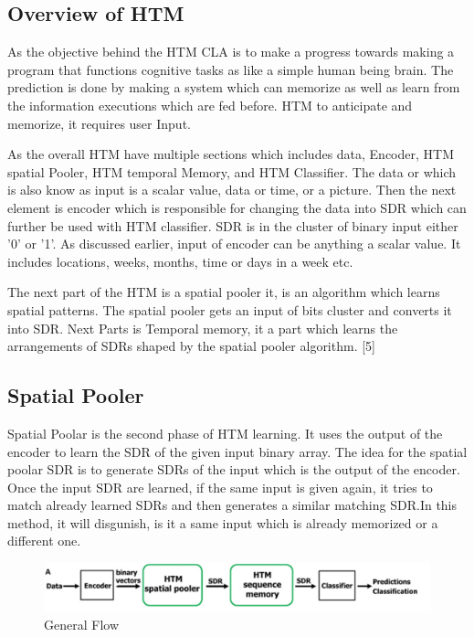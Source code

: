 \documentclass[conference]{IEEEtran}
\begin{document}
\subsection{Overview of HTM}
As the objective behind the HTM CLA is to make a progress towards making a program that functions cognitive tasks as like a simple human being brain. The prediction is done by making a system which can memorize as well as learn from the information executions which are fed before. HTM to anticipate and memorize, it requires user Input. 

As the overall HTM have multiple sections which includes data, Encoder, HTM spatial Pooler, HTM temporal Memory, and HTM Classifier. The data or which is also know as input is a scalar value, data or time, or a picture. Then the next element is encoder which is responsible for changing the data into SDR which can further be used with HTM classifier. SDR is in the cluster of binary input either '0' or '1'. As discussed earlier, input of encoder can be anything a scalar value. It includes locations, weeks, months, time or days in a week etc. 

The next part of the HTM is a spatial pooler it, is an algorithm which learns spatial patterns. The spatial pooler gets an input of bits cluster and converts it into SDR. Next Parts is Temporal memory, it a part which learns the arrangements of SDRs shaped by the spatial pooler algorithm. [5]  


\subsection{Spatial Pooler}
Spatial Poolar is the second phase of HTM learning. It uses the output of the encoder to learn the SDR of the given input binary array. The idea for the spatial poolar SDR is to generate SDRs of the input which is the output of the encoder. Once the input SDR are learned, if the same input is given again, it tries to match already learned SDRs and then generates a similar matching SDR.In this method, it will disgunish, is it a same input which is already memorized or a different one.   


\begin{figure}[h]
\includegraphics[scale=.40]{HtmPipeline.png}
\caption{General Flow}
\label{fig:enter-label}
\end{figure}
\end{document}
